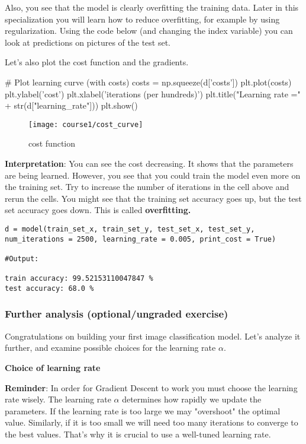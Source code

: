 {{Also, you see that the model is clearly overfitting the training data. Later in this specialization you will learn how to reduce overfitting, for example by using regularization. Using the code below (and changing the index variable) you can look at predictions on pictures of the test set.


Let's also plot the cost function and the gradients.
\begin{mypython}
# Plot learning curve (with costs)
costs = np.squeeze(d['costs'])
plt.plot(costs)
plt.ylabel('cost')
plt.xlabel('iterations (per hundreds)')
plt.title("Learning rate =" + str(d["learning_rate"]))
plt.show()
\end{mypython}

\begin{figure}[h]
\begin{center}
\texttt{[image: course1/cost\_curve]}
\end{center}
\caption{cost function}
\label{fig:cost_function}
\end{figure}


{\textbf {Interpretation}}: You can see the cost decreasing. It shows that the parameters are being learned. However, you see that you could train the model even more on the training set. Try to increase the number of iterations in the cell above and rerun the cells. You might see that the training set accuracy goes up, but the test set accuracy goes down. This is called {\textbf {overfitting.}}

\begin{verbatim}
d = model(train_set_x, train_set_y, test_set_x, test_set_y, num_iterations = 2500, learning_rate = 0.005, print_cost = True)

#Output:

train accuracy: 99.52153110047847 %
test accuracy: 68.0 %
\end{verbatim}



\subsubsection{Further analysis (optional/ungraded exercise)}

Congratulations on building your first image classification model. Let's analyze it further, and examine possible choices for the learning rate $\alpha$. 


{\textbf {Choice of learning rate}}

{\textbf {Reminder}}: In order for Gradient Descent to work you must choose the learning rate wisely. The learning rate $\alpha$ determines how rapidly we update the parameters. If the learning rate is too large we may "overshoot" the optimal value. Similarly, if it is too small we will need too many iterations to converge to the best values. That's why it is crucial to use a well-tuned learning rate.

}}
